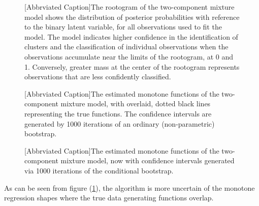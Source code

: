 \documentclass[10pt]{olplainarticle}\usepackage[]{graphicx}\usepackage[]{color}
\begin{document}
\begin{figure}

[Abbrviated Caption]{The rootogram of the two-component mixture model shows the distribution of posterior probabilities with reference to the binary latent variable, for all observations used to fit the model. The model indicates higher confidence in the identification of clusters and the classification of individual observations when the observations accumulate near the limits of the rootogram, at 0 and 1. Conversely, greater mass at the center of the rootogram represents observations that are less confidently classified.}
\end{figure}

\begin{figure}

[Abbrviated Caption]{The estimated monotone functions of the two-component mixture model, with overlaid, dotted black lines representing the true functions. The confidence intervals are generated by 1000 iterations of an ordinary (non-parametric) bootstrap.} \label{fig:pseudo_mixture_monovar_b}
\end{figure}

\begin{figure} 

[Abbrviated Caption]{The estimated monotone functions of the two-component mixture model, now with confidence intervals generated via 1000 iterations of the conditional bootstrap.}
\end{figure}

As can be seen from figure (\ref{fig:pseudo_mixture_monovar_b}), the algorithm is more uncertain of the monotone regression shapes where the true data generating functions overlap. 
\end{document}
